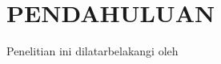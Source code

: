 \chapter{PENDAHULUAN}
\label{chap:pendahuluan}

Penelitian ini dilatarbelakangi oleh \lipsum[1][1-5]






